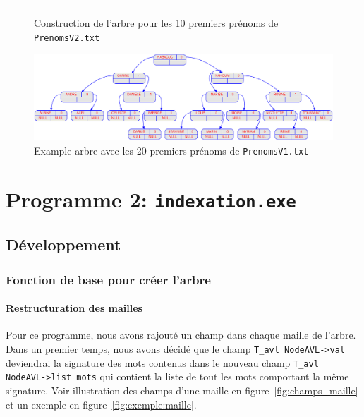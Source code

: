 \documentclass{article} %
\begin{document}
\begin{figure}[p]
\begin{center}
      \rule{\linewidth}{.5pt} %
   
    
  \end{center}
  
  \caption{Construction de l'arbre pour les 10 premiers prénoms de \texttt{PrenomsV2.txt}}
  \label{fig:prog1_1}
\end{figure}

\begin{figure}[p]
  \begin{center}
    \includegraphics[scale=0.36]{Img_prog1/displayAVL_20.eps}
  \end{center}
  \caption{Example arbre avec les 20 premiers prénoms de \texttt{PrenomsV1.txt}}
\end{figure}

\section{Programme 2: \texttt{indexation.exe} \label{sec:prog_2}}
\subsection{Développement}

\subsubsection{Fonction de base pour créer l'arbre}
\paragraph{Restructuration des mailles} Pour ce programme, nous avons rajouté un champ dans chaque maille de l'arbre. Dans un premier temps, nous avons décidé que le champ \texttt{T\_avl NodeAVL->val} deviendrai la signature des mots contenus dans le nouveau champ \texttt{T\_avl NodeAVL->list\_mots} qui contient la liste de tout les mots comportant la même signature. Voir illustration des champs d'une maille en figure~\ref{fig:champs_maille} et un exemple en figure~\ref{fig:exemple:maille}.
\end{document}
